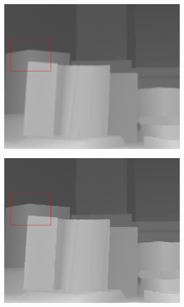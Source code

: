 \documentclass[preprint,10pt,5p,times,twocolumn]{elsarticle}
\begin{document}
\begin{figure}[t]
\begin{center}
\begin{subfigure}[b]{0.136\linewidth}
    \includegraphics[width=\linewidth]{cmp_book_8X_JBL.png}
    \label{fig:}
\end{subfigure}
\begin{subfigure}[b]{0.136\linewidth}
    \includegraphics[width=\linewidth]{cmp_book_8X_AR.png}
    \label{fig:} %
\end{subfigure}
\begin{subfigure}[b]{0.136\linewidth}

\end{subfigure}
\end{center}
\end{figure}
\end{document}

